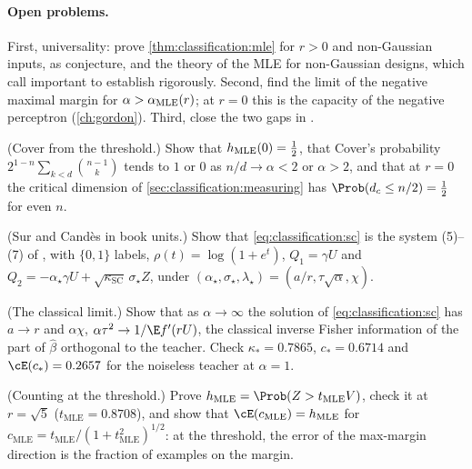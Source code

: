\begin{refsection}
\paragraph{Open problems.} First, universality: prove \cref{thm:classification:mle} for $r>0$ and non-Gaussian inputs, as \textcite[Sec.~5]{CandesSur2020} conjecture, and the theory of the MLE for non-Gaussian designs, which \textcite{SurCandes2019} call important to establish rigorously. Second, find the limit of the negative maximal margin for $\alpha>\alpha_{\mathrm{MLE}}(r)$; at $r=0$ this is the capacity of the negative perceptron (\cref{ch:gordon}). Third, close the two gaps in \textcite{SalehiAbbasiHassibi2019}.

\begin{exercises}
\item \consolidation (Cover from the threshold.) Show that $h_{\mathrm{MLE}}(0)=\frac12$, that Cover's probability $2^{1-n}\sum_{k<d}\binom{n-1}k$ tends to $1$ or $0$ as $n/d\to\alpha<2$ or $\alpha>2$, and that at $r=0$ the critical dimension of \cref{sec:classification:measuring} has $\Prob(d_c\le n/2)=\frac12$ for even $n$.\label{ex:classification:cover}

\item \consolidation (Sur and Candès in book units.) Show that \eqref{eq:classification:sc} is the system (5)--(7) of \textcite{SurCandes2019}, with $\{0,1\}$ labels, $\rho(t)=\log(1+e^t)$, $Q_1=\gamma U$ and $Q_2=-\alpha_\star\gamma U+\sqrt{\kappa_{\mathrm{SC}}}\,\sigma_\star Z$, under $(\alpha_\star,\sigma_\star,\lambda_\star)=(a/r,\tau\sqrt\alpha,\chi)$. \label{ex:classification:surcandes}

\item \consolidation (The classical limit.) Show that as $\alpha\to\infty$ the solution of \eqref{eq:classification:sc} has $a\to r$ and $\alpha\chi$, $\alpha\tau^2\to1/\E f'(rU)$, the classical inverse Fisher information of the part of $\hat\beta$ orthogonal to the teacher. Check $\kappa_*=0.7865$, $c_*=0.6714$ and $\cE(c_*)=0.2657$ for the noiseless teacher at $\alpha=1$.\label{ex:classification:classical}

\item \byhand (Counting at the threshold.) Prove $\classificationh=\Prob(Z>t_{\mathrm{MLE}}V)$, check it at $r=\sqrt5$ ($t_{\mathrm{MLE}}=0.8708$), and show that $\cE(c_{\mathrm{MLE}})=\classificationh$ for $c_{\mathrm{MLE}}=t_{\mathrm{MLE}}/(1+t_{\mathrm{MLE}}^2)^{1/2}$: at the threshold, the error of the max-margin direction is the fraction of examples on the margin.\label{ex:classification:isostatic}


\end{exercises}
\end{refsection}
